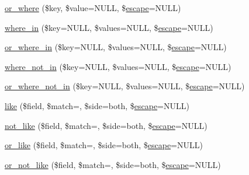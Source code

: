 \begin{DoxyCompactItemize}
\item 
\mbox{\hyperlink{class_c_i___d_b__query__builder_a5f49ad7cee0a2d02752f40d6e2088985}{or\+\_\+where}} (\$key, \$value=N\+U\+LL, \$\mbox{\hyperlink{class_c_i___d_b__driver_a75beb60cdd3ee1875646d729963f5f5f}{escape}}=N\+U\+LL)
\item 
\mbox{\hyperlink{class_c_i___d_b__query__builder_ac9ab7f835849f65667a48c3a6dab9feb}{where\+\_\+in}} (\$key=N\+U\+LL, \$values=N\+U\+LL, \$\mbox{\hyperlink{class_c_i___d_b__driver_a75beb60cdd3ee1875646d729963f5f5f}{escape}}=N\+U\+LL)
\item 
\mbox{\hyperlink{class_c_i___d_b__query__builder_ad0c87e2d88224a329125e2ed95c048a8}{or\+\_\+where\+\_\+in}} (\$key=N\+U\+LL, \$values=N\+U\+LL, \$\mbox{\hyperlink{class_c_i___d_b__driver_a75beb60cdd3ee1875646d729963f5f5f}{escape}}=N\+U\+LL)
\item 
\mbox{\hyperlink{class_c_i___d_b__query__builder_aa47530ec7d6fa4bbf9c3a0b8d9626c97}{where\+\_\+not\+\_\+in}} (\$key=N\+U\+LL, \$values=N\+U\+LL, \$\mbox{\hyperlink{class_c_i___d_b__driver_a75beb60cdd3ee1875646d729963f5f5f}{escape}}=N\+U\+LL)
\item 
\mbox{\hyperlink{class_c_i___d_b__query__builder_a979d56c3fcaab46c5598f816d8648888}{or\+\_\+where\+\_\+not\+\_\+in}} (\$key=N\+U\+LL, \$values=N\+U\+LL, \$\mbox{\hyperlink{class_c_i___d_b__driver_a75beb60cdd3ee1875646d729963f5f5f}{escape}}=N\+U\+LL)
\item 
\mbox{\hyperlink{class_c_i___d_b__query__builder_a05a74b3bb4c41d84144cacf5ad2f1da9}{like}} (\$field, \$match=\textquotesingle{}\textquotesingle{}, \$side=\textquotesingle{}both\textquotesingle{}, \$\mbox{\hyperlink{class_c_i___d_b__driver_a75beb60cdd3ee1875646d729963f5f5f}{escape}}=N\+U\+LL)
\item 
\mbox{\hyperlink{class_c_i___d_b__query__builder_acc2cf1193bfb91ae2e19de8438b3889f}{not\+\_\+like}} (\$field, \$match=\textquotesingle{}\textquotesingle{}, \$side=\textquotesingle{}both\textquotesingle{}, \$\mbox{\hyperlink{class_c_i___d_b__driver_a75beb60cdd3ee1875646d729963f5f5f}{escape}}=N\+U\+LL)
\item 
\mbox{\hyperlink{class_c_i___d_b__query__builder_a339bbfa2c2e88b5b5ff248368294fa87}{or\+\_\+like}} (\$field, \$match=\textquotesingle{}\textquotesingle{}, \$side=\textquotesingle{}both\textquotesingle{}, \$\mbox{\hyperlink{class_c_i___d_b__driver_a75beb60cdd3ee1875646d729963f5f5f}{escape}}=N\+U\+LL)
\item 
\mbox{\hyperlink{class_c_i___d_b__query__builder_a9680fb43c820bd0a243e232b9347677e}{or\+\_\+not\+\_\+like}} (\$field, \$match=\textquotesingle{}\textquotesingle{}, \$side=\textquotesingle{}both\textquotesingle{}, \$\mbox{\hyperlink{class_c_i___d_b__driver_a75beb60cdd3ee1875646d729963f5f5f}{escape}}=N\+U\+LL)

\end{DoxyCompactItemize}
